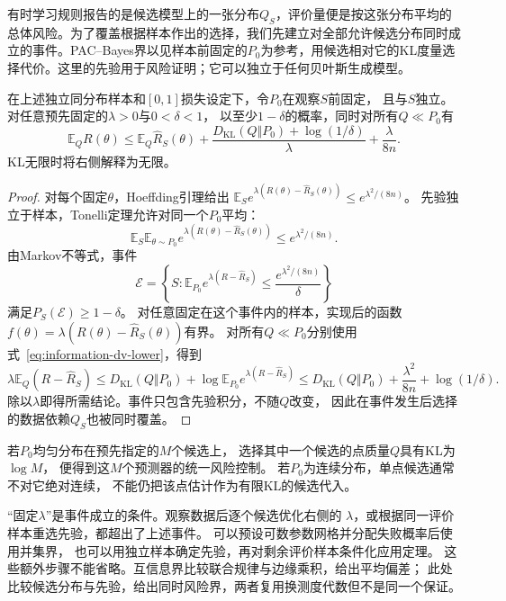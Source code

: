 有时学习规则报告的是候选模型上的一张分布\(Q_S\)，评价量便是按这张分布平均的总体风险。为了覆盖根据样本作出的选择，我们先建立对全部允许候选分布同时成立的事件。PAC--Bayes界以见样本前固定的\(P_0\)为参考，用候选相对它的KL度量选择代价。这里的先验用于风险证明；它可以独立于任何贝叶斯生成模型。

\begin{theorem}
\label{thm:information-pac-bayes-basic}
在上述独立同分布样本和\([0,1]\)损失设定下，令\(P_0\)在观察\(S\)前固定，
且与\(S\)独立。对任意预先固定的\(\lambda>0\)与\(0<\delta<1\)，
以至少\(1-\delta\)的概率，同时对所有\(Q\ll P_0\)有
\begin{equation}
  \mathbb E_QR(\theta)
  \leq\mathbb E_Q\widehat R_S(\theta)
  +\frac{D_{\mathrm{KL}}(Q\Vert P_0)+\log(1/\delta)}{\lambda}
  +\frac{\lambda}{8n}.
  \label{eq:information-pac-bayes-basic}
\end{equation}
KL无限时将右侧解释为无限。
\end{theorem}
\begin{proof}
对每个固定\(\theta\)，Hoeffding引理给出
\(\mathbb E_Se^{\lambda(R(\theta)-\widehat R_S(\theta))}
\leq e^{\lambda^2/(8n)}\)。
先验独立于样本，Tonelli定理允许对同一个\(P_0\)平均：
\[
  \mathbb E_S\mathbb E_{\theta\sim P_0}
  e^{\lambda(R(\theta)-\widehat R_S(\theta))}
  \leq e^{\lambda^2/(8n)}.
\]
由Markov不等式，事件
\[
  \mathcal E=
  \left\{S:\mathbb E_{P_0}e^{\lambda(R-\widehat R_S)}
  \leq\frac{e^{\lambda^2/(8n)}}{\delta}\right\}
\]
满足\(P_S(\mathcal E)\geq1-\delta\)。
对任意固定在这个事件内的样本，实现后的函数
\(f(\theta)=\lambda(R(\theta)-\widehat R_S(\theta))\)有界。
对所有\(Q\ll P_0\)分别使用式~\eqref{eq:information-dv-lower}，得到
\[
  \lambda\mathbb E_Q(R-\widehat R_S)
  \leq D_{\mathrm{KL}}(Q\Vert P_0)
       +\log\mathbb E_{P_0}e^{\lambda(R-\widehat R_S)}
  \leq D_{\mathrm{KL}}(Q\Vert P_0)
       +\frac{\lambda^2}{8n}+\log(1/\delta).
\]
除以\(\lambda\)即得所需结论。事件只包含先验积分，不随\(Q\)改变，
因此在事件发生后选择的数据依赖\(Q_S\)也被同时覆盖。
\end{proof}

若\(P_0\)均匀分布在预先指定的\(M\)个候选上，
选择其中一个候选的点质量\(Q\)具有KL为\(\log M\)，
便得到这\(M\)个预测器的统一风险控制。
若\(P_0\)为连续分布，单点候选通常不对它绝对连续，
不能仍把该点估计作为有限KL的候选代入。

“固定\(\lambda\)”是事件成立的条件。观察数据后逐个候选优化右侧的
\(\lambda\)，或根据同一评价样本重选先验，都超出了上述事件。
可以预设可数参数网格并分配失败概率后使用并集界，
也可以用独立样本确定先验，再对剩余评价样本条件化应用定理。
这些额外步骤不能省略。互信息界比较联合规律与边缘乘积，给出平均偏差；
此处比较候选分布与先验，给出同时风险界，两者复用换测度代数但不是同一个保证。

